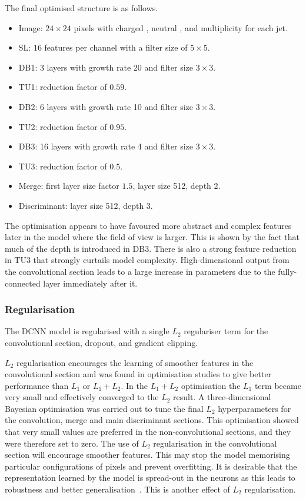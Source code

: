 The final optimised structure is as follows.
\begin{itemize}[noitemsep]
    \item Image: $24\times{24}$ pixels with charged \pt, neutral \pt, and multiplicity for each jet.
    \item SL: 16 features per channel with a filter size of $5\times{}5$.
    \item DB1: 3 layers with growth rate 20 and filter size $3\times{}3$.
    \item TU1: reduction factor of $0.59$.
    \item DB2: 6 layers with growth rate 10 and filter size $3\times{}3$.
    \item TU2: reduction factor of $0.95$.
    \item DB3: 16 layers with growth rate 4 and filter size $3\times{}3$.
    \item TU3: reduction factor of $0.5$.
    \item Merge: first layer size factor $1.5$, layer size 512, depth 2.
    \item Discriminant: layer size 512, depth 3.
\end{itemize}
The optimisation appears to have favoured more abstract and complex features later in the model where the field of view is larger. This is shown by the fact that much of the depth is introduced in DB3. 
There is also a strong feature reduction in TU3 that strongly curtails model complexity. High-dimensional output from the convolutional section leads to a large increase in parameters due to the fully-connected layer immediately after it. 




\subsubsection{Regularisation}
The DCNN model is regularised with a single $L_2$ regulariser term for the convolutional section, dropout, and gradient clipping.

$L_2$ regularisation encourages the learning of smoother features in the convolutional section and was found in optimisation studies to give better performance than $L_1$ or $L_1 + L_2$. 
In the $L_1 + L_2$ optimisation the $L_1$ term became very small and effectively converged to the $L_2$ result.
A three-dimensional Bayesian optimisation was carried out to tune the final $L_2$ hyperparameters for the convolution, merge and main discriminant sections.
This optimisation showed that very small values are preferred in the non-convolutional sections, and they were therefore set to zero. 
The use of $L_2$ regularisation in the convolutional section will encourage smoother features. This may stop the model memorising particular configurations of pixels and prevent overfitting. 
It is desirable that the representation learned by the model is spread-out in the neurons as this leads to robustness and better generalisation~\cite{DeepMindDeletion}.
This is another effect of $L_2$ regularisation.

